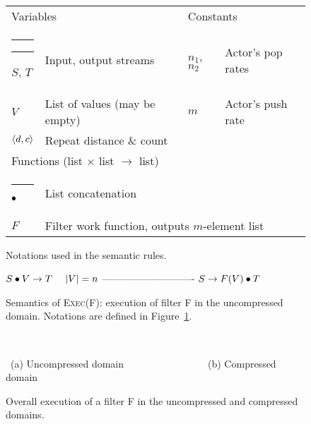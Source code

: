 \newcommand{\tablesep}{\hspace{-3.5pt}}
\begin{figure}[t]
\hspace{-5pt}\begin{tabular}{llll}
\multicolumn{2}{l}{Variables} & \multicolumn{2}{l}{{\tablesep}Constants} \\ \rule[10pt]{1.9in}{0.3pt}\hspace{0.1in}\rule[10pt]{1.3in}{0.3pt}\hspace{-1.3in}\hspace{-2pt}\hspace{-1.97in}\hspace{-2pt}
$S$, $T$ & {\tablesep}Input, output streams & {\tablesep}$n_1$, $n_2$ & {\tablesep}Actor's pop rates \\
$V$ & {\tablesep}List of values (may be empty) & {\tablesep}$m$ & {\tablesep}Actor's push rate \\
$\langle d, c\rangle$ & {\tablesep}Repeat distance \& count & {\tablesep}~ & ~ \vspace{6pt} \\
\multicolumn{2}{l}{Functions (list $\times$ list $\rightarrow$ list)}& ~ & ~ \\ \rule[10pt]{3.3in}{0.3pt}\hspace{-3.3in}
$\bullet$ & {\tablesep}List concatenation & ~ & ~ \\
$F$ & \multicolumn{3}{l}{{\tablesep}Filter work function, outputs $m$-element list}
\end{tabular}
\caption{Notations used in the semantic rules.\protect\label{fig:notations}}
\end{figure}

\begin{figure}[t]
$S \bullet V \rightarrow T~~~~|V|=n$ \skiptopb
---------------------------- \skipbot
$S \rightarrow F(V) \bullet T$
\caption{Semantics of \textsc{Exec(F)}: execution of filter F in the
uncompressed domain.  Notations are defined in Figure~\ref{fig:notations}.
\protect\label{fig:exec-rule}}
\end{figure}

\begin{figure}[t]
~~~~~~~~~

\mbox{~}(a) Uncompressed domain~~~~~~~~~~~~~~~~~(b) Compressed domain
\caption{Overall execution of a filter F in the uncompressed and compressed domains.
\protect\label{fig:actor-pic}}
\end{figure}

